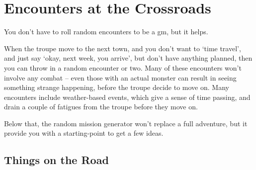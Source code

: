 \chapter{Encounters at the Crossroads}
\label{encounters}

You don't have to roll random encounters to be a \gls{gm}, but it helps.

When the troupe move to the next town, and you don't want to `time travel', and just say `okay, next week, you arrive', but don't have anything planned, then you can throw in a random encounter or two.
Many of these encounters won't involve any combat -- even those with an actual monster can result in seeing something strange happening, before the troupe decide to move on.
Many encounters include weather-based events, which give a sense of time passing, and drain a couple of \glspl{fatigue} from the troupe before they move on.

Below that, the random mission generator won't replace a full adventure, but it provide you with a starting-point to get a few ideas.

\section{Things on the Road}

